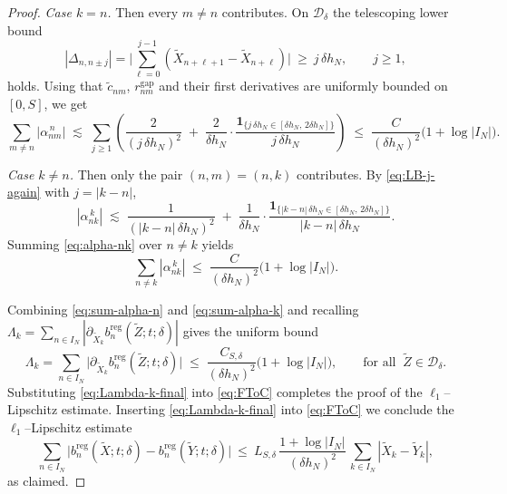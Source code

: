 \documentclass[10pt,a4paper]{amsart}
\begin{document}
\begin{proof}
\medskip\noindent
\emph{Case $k=n$.} Then every $m\neq n$ contributes. On $\mathcal D_\delta$ the
telescoping lower bound
\begin{equation}\label{eq:LB-j-again}
|\Delta_{n,n\pm j}|=\Big|\sum_{\ell=0}^{j-1}
(\widetilde X_{n+\ell+1}-\widetilde X_{n+\ell})\Big|
\ \ge\ j\,\delta h_N,\qquad j\ge 1,
\end{equation}
holds. Using that $\widetilde c_{nm}$, $r^{\mathrm{gap}}_{nm}$ and their first
derivatives are uniformly bounded on $[0,S]$, we get
\begin{equation}\label{eq:sum-alpha-n}
\sum_{m\neq n}\!|\alpha_{n m}^{\,n}|
\;\lesssim\; \sum_{j\ge1}\!\left(\frac{2}{(j\,\delta h_N)^2}
\;+\;\frac{2}{\delta h_N}\cdot
\frac{\mathbf 1_{\{j\,\delta h_N\in[\delta h_N,\,2\delta h_N]\}}}{j\,\delta h_N}\right)
\;\le\; \frac{C}{(\delta h_N)^2}\Big(1+\log |I_N|\Big).
\end{equation}

\medskip\noindent
\emph{Case $k\neq n$.} Then only the pair $(n,m)=(n,k)$ contributes. By
\eqref{eq:LB-j-again} with $j=|k-n|$,
\begin{equation}\label{eq:alpha-nk}
|\alpha_{n k}^{\,k}|
\;\lesssim\; \frac{1}{(|k-n|\,\delta h_N)^2}
\;+\;\frac{1}{\delta h_N}\cdot
\frac{\mathbf 1_{\{|k-n|\,\delta h_N\in[\delta h_N,\,2\delta h_N]\}}}{|k-n|\,\delta h_N}.
\end{equation}
Summing \eqref{eq:alpha-nk} over $n\neq k$ yields
\begin{equation}\label{eq:sum-alpha-k}
\sum_{n\neq k}\!|\alpha_{n k}^{\,k}|
\;\le\; \frac{C}{(\delta h_N)^2}\Big(1+\log |I_N|\Big).
\end{equation}

\medskip
Combining \eqref{eq:sum-alpha-n} and \eqref{eq:sum-alpha-k} and recalling
$\Lambda_k=\sum_{n\in I_N}|\partial_{\widetilde X_k}
b^{\mathrm{reg}}_{n}(\widetilde Z;t;\delta)|$ gives the uniform bound
\begin{equation}\label{eq:Lambda-k-final}
\Lambda_k
=\sum_{n\in I_N}\big|\partial_{\widetilde X_k} b^{\mathrm{reg}}_{n}(\widetilde Z;t;\delta)\big|
\;\le\; \frac{C_{S,\delta}}{(\delta h_N)^2}\Big(1+\log |I_N|\Big),
\qquad \text{for all }\ \widetilde Z\in\mathcal D_\delta.
\end{equation}
Substituting \eqref{eq:Lambda-k-final} into \eqref{eq:FToC} completes the proof
of the $\ell_1$–Lipschitz estimate.
 Inserting \eqref{eq:Lambda-k-final} into \eqref{eq:FToC} we conclude the
\(\ell_1\)–Lipschitz estimate
\begin{equation}
\sum_{n\in I_N}\big|b^{\mathrm{reg}}_{n}(\widetilde X;t;\delta)
-b^{\mathrm{reg}}_{n}(\widetilde Y;t;\delta)\big|
\ \le\ L_{S,\delta}\,
\frac{1+\log |I_N|}{(\delta h_N)^2}\,
\sum_{k\in I_N}|\widetilde X_k-\widetilde Y_k|,
\end{equation}
as claimed.
\end{proof}
\end{document}
